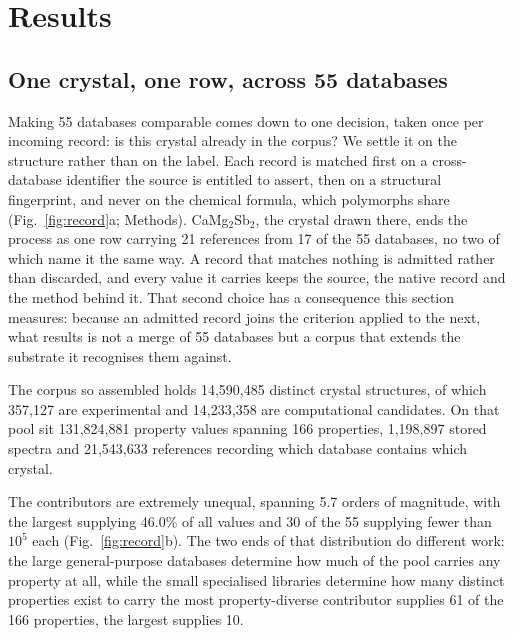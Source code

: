 \section{Results}

\subsection{One crystal, one row, across 55 databases}
\label{sec:index}

Making 55 databases comparable comes down to one decision, taken once per
incoming record: is this crystal already in the corpus? We settle it on the
structure rather than on the label. Each record is matched first on a
cross-database identifier the source is entitled to assert, then on a structural
fingerprint, and never on the chemical formula, which polymorphs share
(Fig.~\ref{fig:record}a; Methods). CaMg$_2$Sb$_2$, the crystal drawn there,
ends the process as one row carrying 21 references from 17 of the 55 databases,
no two of which name it the same way. A record that matches nothing is
admitted rather than discarded, and every value it carries keeps the source, the
native record and the method behind it. That second choice has a consequence this
section measures: because an admitted record joins the criterion applied to the
next, what results is not a merge of 55 databases but a corpus that extends the
substrate it recognises them against.

The corpus so assembled holds 14{,}590{,}485 distinct crystal structures, of
which 357{,}127 are experimental and 14{,}233{,}358 are computational candidates.
On that pool sit 131{,}824{,}881 property values spanning 166 properties,
1{,}198{,}897 stored spectra and 21{,}543{,}633 references recording which
database contains which crystal.

The contributors are extremely unequal, spanning 5.7 orders of magnitude, with
the largest supplying 46.0\% of all values and 30 of the 55 supplying fewer than
$10^5$ each (Fig.~\ref{fig:record}b). The two ends of that distribution do
different work: the large general-purpose databases determine how much of the
pool carries any property at all, while the small specialised libraries determine
how many distinct properties exist to carry
\cite{haastrup2018c2db,zhou20192dmatpedia,zhang2019catalogue} \textemdash{} the
most property-diverse contributor supplies 61 of the 166 properties, the largest
supplies 10.

